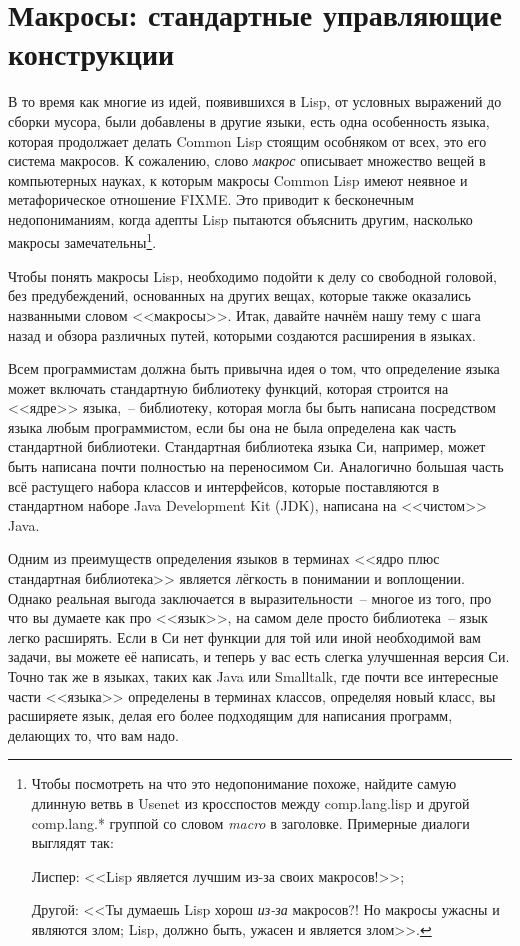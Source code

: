 \chapter{Макросы: стандартные управляющие конструкции}
\label{ch:07}

В то время как многие из идей, появившихся в Lisp, от условных выражений до сборки
мусора, были добавлены в другие языки, есть одна особенность языка, которая продолжает
делать Common Lisp стоящим особняком от всех, это его система макросов. К сожалению, слово
\textit{макрос} описывает множество вещей в компьютерных науках, к которым макросы Common Lisp
имеют неявное и метафорическое отношение FIXME. Это приводит к бесконечным недопониманиям,
когда адепты Lisp пытаются объяснить другим, насколько макросы
замечательны\footnote{Чтобы посмотреть на что это недопонимание похоже, найдите самую
  длинную ветвь в Usenet из кросспостов между comp.lang.lisp и другой comp.lang.* группой
  со словом \textit{macro} в заголовке. Примерные диалоги выглядят так:

Лиспер: <<Lisp является лучшим из-за своих макросов!>>;

Другой: <<Ты думаешь Lisp хорош \textit{из-за} макросов?! Но макросы ужасны и являются
злом; Lisp, должно быть, ужасен и является злом>>.}.

Чтобы понять макросы Lisp, необходимо подойти к делу со свободной головой, без
предубеждений, основанных на других вещах, которые также оказались названными словом
<<макросы>>. Итак, давайте начнём нашу тему с шага назад и обзора различных путей, которыми
создаются расширения в языках.

Всем программистам должна быть привычна идея о том, что определение языка может включать
стандартную библиотеку функций, которая строится на <<ядре>> языка,~-- библиотеку, которая
могла бы быть написана посредством языка любым программистом, если бы она не была
определена как часть стандартной библиотеки. Стандартная библиотека языка Си, например,
может быть написана почти полностью на переносимом Си. Аналогично большая часть всё
растущего набора классов и интерфейсов, которые поставляются в стандартном наборе Java
Development Kit (JDK), написана на <<чистом>> Java.

Одним из преимуществ определения языков в терминах <<ядро плюс стандартная библиотека>> является
лёгкость в понимании и воплощении. Однако реальная выгода заключается в выразительности~--
многое из того, про что вы думаете как про <<язык>>, на самом деле просто библиотека~-- язык
легко расширять. Если в Си нет функции для той или иной необходимой вам задачи, вы можете
её написать, и теперь у вас есть слегка улучшенная версия Си. Точно так же в языках, таких
как Java или Smalltalk, где почти все интересные части <<языка>> определены в терминах
классов, определяя новый класс, вы расширяете язык, делая его более подходящим для
написания программ, делающих то, что вам надо.

